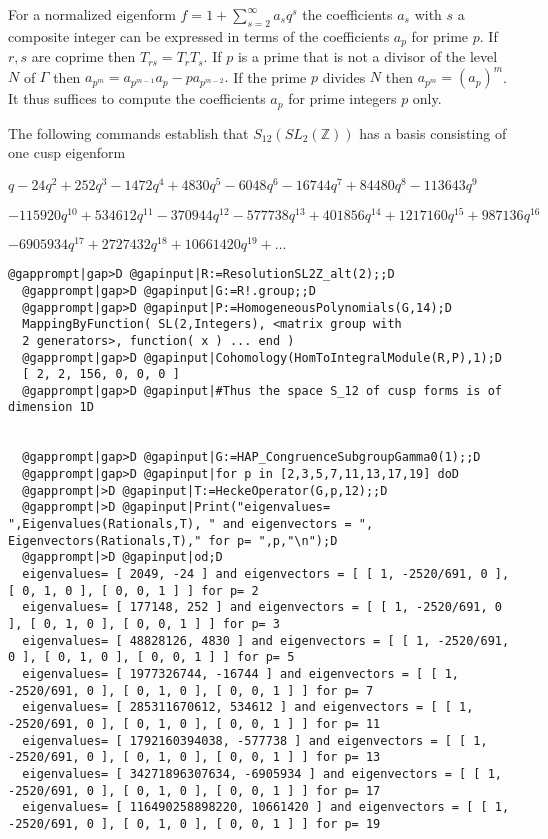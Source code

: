 \documentclass[a4paper,11pt]{report}
\begin{document}
{{\begin{Verbatim}[commandchars=!@|,fontsize=\small,frame=single,label=Example]
\end{Verbatim}
 

 For a normalized eigenform $f=1 + \sum_{s=2}^\infty a_sq^s$ the coefficients $a_s$ with $s$ a composite integer can be expressed in terms of the coefficients $a_p$ for prime $p$. If $r,s$ are coprime then $T_{rs} =T_rT_s$. If $p$ is a prime that is not a divisor of the level $N$ of $\Gamma$ then $a_{p^m} =a_{p^{m-1}}a_p - p a_{p^{m-2}}.$ If the prime $ p$ divides $N$ then $a_{p^m} = (a_p)^m$. It thus suffices to compute the coefficients $a_p$ for prime integers $p$ only. 

 The following commands establish that $S_{12}(SL_2(\mathbb Z))$ has a basis consisting of one cusp eigenform 

$q - 24q^2 + 252q^3 - 1472q^4 + 4830q^5 - 6048q^6 - 16744q^7 + 84480q^8 -
113643q^9 $ 

$- 115920q^{10} + 534612q^{11} - 370944q^{12} - 577738q^{13} + 401856q^{14} +
1217160q^{15} + 987136q^{16}$ 

$ - 6905934q^{17} + 2727432q^{18} + 10661420q^{19} + ...$ 
\begin{Verbatim}[commandchars=@|D,fontsize=\small,frame=single,label=Example]
  @gapprompt|gap>D @gapinput|R:=ResolutionSL2Z_alt(2);;D
  @gapprompt|gap>D @gapinput|G:=R!.group;;D
  @gapprompt|gap>D @gapinput|P:=HomogeneousPolynomials(G,14);D
  MappingByFunction( SL(2,Integers), <matrix group with 
  2 generators>, function( x ) ... end )
  @gapprompt|gap>D @gapinput|Cohomology(HomToIntegralModule(R,P),1);D
  [ 2, 2, 156, 0, 0, 0 ]
  @gapprompt|gap>D @gapinput|#Thus the space S_12 of cusp forms is of dimension 1D
  
  
  @gapprompt|gap>D @gapinput|G:=HAP_CongruenceSubgroupGamma0(1);;D
  @gapprompt|gap>D @gapinput|for p in [2,3,5,7,11,13,17,19] doD
  @gapprompt|>D @gapinput|T:=HeckeOperator(G,p,12);;D
  @gapprompt|>D @gapinput|Print("eigenvalues= ",Eigenvalues(Rationals,T), " and eigenvectors = ", Eigenvectors(Rationals,T)," for p= ",p,"\n");D
  @gapprompt|>D @gapinput|od;D
  eigenvalues= [ 2049, -24 ] and eigenvectors = [ [ 1, -2520/691, 0 ], [ 0, 1, 0 ], [ 0, 0, 1 ] ] for p= 2
  eigenvalues= [ 177148, 252 ] and eigenvectors = [ [ 1, -2520/691, 0 ], [ 0, 1, 0 ], [ 0, 0, 1 ] ] for p= 3
  eigenvalues= [ 48828126, 4830 ] and eigenvectors = [ [ 1, -2520/691, 0 ], [ 0, 1, 0 ], [ 0, 0, 1 ] ] for p= 5
  eigenvalues= [ 1977326744, -16744 ] and eigenvectors = [ [ 1, -2520/691, 0 ], [ 0, 1, 0 ], [ 0, 0, 1 ] ] for p= 7
  eigenvalues= [ 285311670612, 534612 ] and eigenvectors = [ [ 1, -2520/691, 0 ], [ 0, 1, 0 ], [ 0, 0, 1 ] ] for p= 11
  eigenvalues= [ 1792160394038, -577738 ] and eigenvectors = [ [ 1, -2520/691, 0 ], [ 0, 1, 0 ], [ 0, 0, 1 ] ] for p= 13
  eigenvalues= [ 34271896307634, -6905934 ] and eigenvectors = [ [ 1, -2520/691, 0 ], [ 0, 1, 0 ], [ 0, 0, 1 ] ] for p= 17
  eigenvalues= [ 116490258898220, 10661420 ] and eigenvectors = [ [ 1, -2520/691, 0 ], [ 0, 1, 0 ], [ 0, 0, 1 ] ] for p= 19
  

\end{Verbatim}}}
\end{document}
